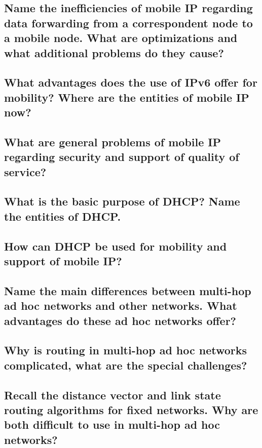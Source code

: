 \subsection{Name the inefficiencies of mobile IP regarding data forwarding from a correspondent
node to a mobile node. What are optimizations and what additional problems do they
cause?}

\subsection{What advantages does the use of IPv6 offer for mobility? Where are the entities of
mobile IP now?}

\subsection{What are general problems of mobile IP regarding security and support of quality of
service?}

\subsection{What is the basic purpose of DHCP? Name the entities of DHCP.}

\subsection{How can DHCP be used for mobility and support of mobile IP?}

\subsection{Name the main differences between multi-hop ad hoc networks and other networks.
What advantages do these ad hoc networks offer?}

\subsection{Why is routing in multi-hop ad hoc networks complicated, what are the special
challenges?}

\subsection{Recall the distance vector and link state routing algorithms for fixed networks. Why
are both difficult to use in multi-hop ad hoc networks?}

